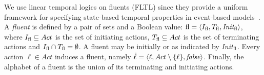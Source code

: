 We use linear temporal logics on fluents (FLTL) since they provide a uniform framework
for specifying state-based temporal properties in event-based models~\cite{DBLP:conf/sigsoft/GiannakopoulouM03}. 
A \emph{fluent} \fluent is defined by a pair of sets and a Boolean value: $\emph{\emph{fl}} = \langle I_{\emph{\emph{fl}}}, T_{\emph{\emph{fl}}}, \emph{Init}_{\emph{\emph{fl}}} \rangle$, where $I_{\emph{\emph{fl}}}\subseteq Act$ is the set of initiating actions, $T_{\emph{\emph{fl}}}\subseteq Act$ is the set of terminating actions and $I_{\emph{\emph{fl}}}\cap T_{\emph{\emph{fl}}}=\emptyset$. 
A fluent may be initially \true or \false as indicated by \emph{Init}$_{\emph{\emph{fl}}}$. 
Every action $\ell\in Act$ induces a fluent, namely $\dot{\ell}=\langle \ell, Act\setminus \{\ell\}, \emph{false}\rangle$. 
Finally, the alphabet of a fluent is the union of its terminating and initiating actions.

